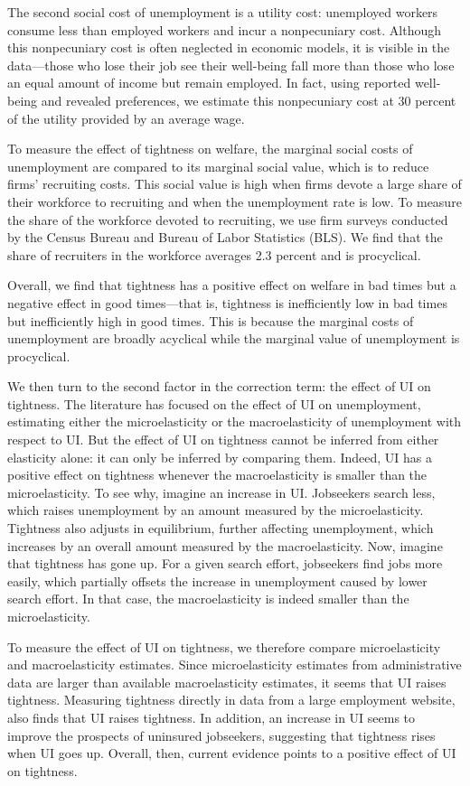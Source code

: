 \documentclass[letterpaper,12pt,leqno]{article}
\begin{document}
The second social cost of unemployment is a utility cost: unemployed workers consume less than employed workers and incur a nonpecuniary cost. Although this nonpecuniary cost is often neglected in economic models, it is visible in the data---those who lose their job see their well-being fall more than those who lose an equal amount of income but remain employed. In fact, using reported well-being and revealed preferences, we estimate this nonpecuniary cost at 30 percent of the utility provided by an average wage.

To measure the effect of tightness on welfare, the marginal social costs of unemployment are compared to its marginal social value, which is to reduce firms' recruiting costs. This social value is high when firms devote a large share of their workforce to recruiting and when the unemployment rate is low. To measure the share of the workforce devoted to recruiting, we use firm surveys conducted by the Census Bureau and Bureau of Labor Statistics (BLS). We find that the share of recruiters in the workforce averages 2.3 percent and is procyclical.

Overall, we find that tightness has a positive effect on welfare in bad times but a negative effect in good times---that is, tightness is inefficiently low in bad times but inefficiently high in good times. This is because the marginal costs of unemployment are broadly acyclical while the marginal value of unemployment is procyclical.

We then turn to the second factor in the correction term: the effect of UI on tightness. The literature has focused on the effect of UI on unemployment, estimating either the microelasticity or the macroelasticity of unemployment with respect to UI. But the effect of UI on tightness cannot be inferred from either elasticity alone: it can only be inferred by comparing them. Indeed, UI has a positive effect on tightness whenever the macroelasticity is smaller than the microelasticity. To see why, imagine an increase in UI. Jobseekers search less, which raises unemployment by an amount measured by the microelasticity. Tightness also adjusts in equilibrium, further affecting unemployment, which increases by an overall amount measured by the macroelasticity. Now, imagine that tightness has gone up. For a given search effort, jobseekers find jobs more easily, which partially offsets the increase in unemployment caused by lower search effort. In that case, the macroelasticity is indeed smaller than the microelasticity.

To measure the effect of UI on tightness, we therefore compare microelasticity and macroelasticity estimates. Since microelasticity estimates from administrative data are larger than available macroelasticity estimates, it seems that UI raises tightness.  Measuring tightness directly in data from a large employment website, \citet{M14} also finds that UI raises tightness. In addition, an increase in UI seems to improve the prospects of uninsured jobseekers, suggesting that tightness rises when UI goes up. Overall, then, current evidence points to a positive effect of UI on tightness.
\end{document}
